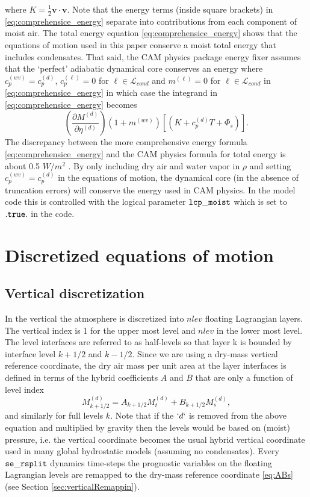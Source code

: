\documentclass{agujournal}
\begin{document}
{where $K=\frac{1}{2}\mathbf{v}\cdot \mathbf{v}$. Note that the energy terms (inside square brackets) in \eqref{eq:comprehensice_energy} separate into contributions from each component of moist air. The total energy equation \eqref{eq:comprehensice_energy} shows that the equations of motion used in this paper conserve a moist total energy that includes condensates. That said, the CAM physics package energy fixer assumes that the `perfect' adiabatic dynamical core conserves an energy where $c_p^{(wv)}= c_p^{(d)}$, $c_p^{(\ell)}=0$ for $\ell\in \mathcal{L}_{cond}$ and $m^{(\ell)}=0$ for $\ell\in \mathcal{L}_{cond}$ in \eqref{eq:comprehensice_energy} \citep{WOHTTV2015JAMES} in which case the integrand in \eqref{eq:comprehensice_energy} becomes
\begin{equation}
\left( \frac{\partial M^{(d)}}{\partial \eta^{(d)}} \right)\left(1+m^{(wv)}\right)\left[ \left(K+c_p^{(d)}T+\Phi_s\right)\right].
\end{equation}
The discrepancy between the more comprehensive energy formula \eqref{eq:comprehensice_energy} and the CAM physics formula for total energy is about 0.5 $W/m^2$ \citep{T2011LNCSEb}. By only including dry air and water vapor   in $\rho$ and setting $c_p^{(wv)}= c_p^{(d)}$ in the equations of motion, the dynamical core (in the absence of truncation errors) will conserve the energy used in CAM physics. In the model code this is controlled with the logical parameter $\tt{lcp\_moist}$ which is set to $\tt{.true.}$ in the code.


\section{Discretized equations of motion}\label{sec:discretized_eqs}
\subsection{Vertical discretization}
In the vertical the atmosphere is discretized into $nlev$ floating Lagrangian layers. The vertical index is 1 for the upper most level and $nlev$ in the lower most level. The level interfaces are referred to as half-levels so that layer k is bounded by interface level $k+1/2$ and $k-1/2$. Since we are using a dry-mass vertical reference coordinate, the dry air mass per unit area at the layer interfaces is defined in terms of the hybrid coefficients $A$ and $B$
 that are only a function of level index
\begin{equation}
M^{(d)}_{k+1/2}=A_{k+1/2}M^{(d)}_t+B_{k+1/2}M_s^{(d)},\label{eq:ABs}
\end{equation}
and similarly for full levels $k$. Note that if the $`d`$ is removed from the above equation and multiplied by gravity then the levels would be based on (moist) pressure, i.e. the vertical coordinate becomes the usual hybrid vertical coordinate used in many global hydrostatic models (assuming no condensates). Every ${\tt{se\_rsplit}}$ dynamics time-steps the prognostic variables on the floating Lagrangian levels are remapped to the dry-mass reference coordinate \eqref{eq:ABs} (see Section \ref{sec:verticalRemappin}). 

}
\end{document}
